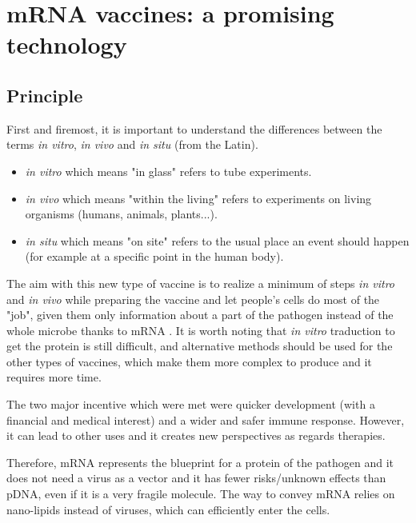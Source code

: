\documentclass{article}
\begin{document}

    \section{mRNA vaccines: a promising technology}

        \subsection{Principle}

                First and firemost, it is important to understand the differences between the terms \emph{in vitro}, \emph{in vivo} and \emph{in situ} (from the Latin).
                \begin{itemize}
                    \item \emph{in vitro} which means "in glass" refers to tube experiments.
                    \item \emph{in vivo} which means "within the living" refers to experiments on living organisms (humans, animals, plants...).
                    \item \emph{in situ} which means "on site" refers to the usual place an event should happen (for example at a specific point in the human body).
                \end{itemize}
                The aim with this new type of vaccine is to realize a minimum of steps \emph{in vitro} and \emph{in vivo} while preparing the vaccine and
                    let people's cells do most of the "job", given them only information about a part of the pathogen instead of the whole microbe thanks
                    to mRNA \autocite{maruggiMRNATransformativeTechnology2019}.         
                It is worth noting that \emph{in vitro} traduction to get the protein is still difficult, and alternative methods should be used for the other
                    types of vaccines, which make them more complex to produce and it requires more time.

                The two major incentive which were met were quicker development (with a financial and medical interest) and a wider and safer immune response.
                However, it can lead to other uses and it creates new perspectives as regards therapies.

                Therefore, mRNA represents the blueprint for a protein of the pathogen and it does not need a virus as a vector
                    and it has fewer risks/unknown effects than pDNA, even if it is a very fragile molecule.
                The way to convey mRNA relies on nano-lipids instead of viruses, which can efficiently enter the cells.
\end{document}
